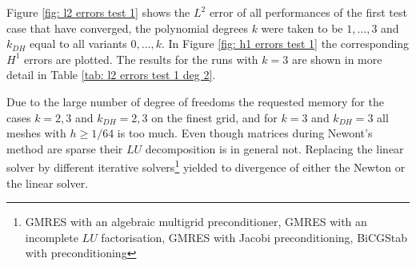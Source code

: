 
Figure \ref{fig: l2 errors test 1} shows the $L^2$ error of all performances of the first test case that have converged, the polynomial degrees $k$ were taken to be $1,\dots,3$ and $k_{DH}$ equal to all variants $0, \dots, k$. In Figure \ref{fig: h1 errors test 1} the corresponding $H^1$ errors are plotted.
The results for the runs with $k=3$ are shown in more detail in Table \ref{tab: l2 errors test 1 deg 2}. %

Due to the large number of degree of freedoms the requested memory for the cases $k=2,3$ and $k_{DH}=2,3$ on the finest grid, and for $k=3$ and $k_{DH}=3$ all meshes with $h\geq 1/64$ is too much. Even though matrices during Newont's method are sparse their $LU$ decomposition is in general not. Replacing the linear solver by different iterative solvers\footnote{GMRES with an algebraic multigrid preconditioner, GMRES with an incomplete $LU$ factorisation, GMRES with Jacobi preconditioning, BiCGStab with preconditioning} yielded to divergence of either the Newton or the linear solver.


